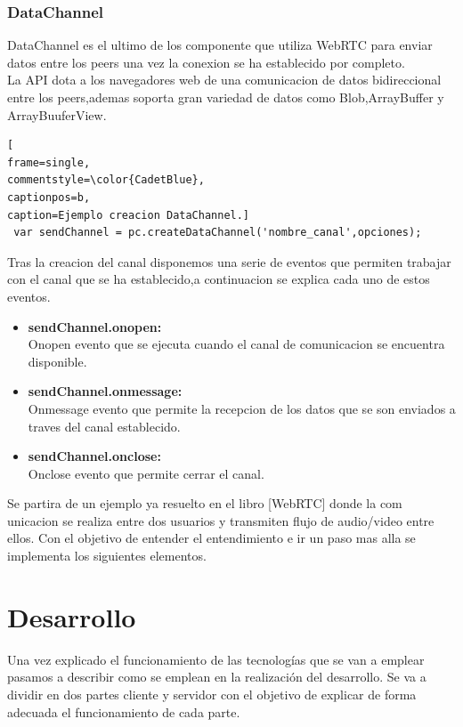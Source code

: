 \subsubsection*{DataChannel}
DataChannel es el ultimo de los componente que utiliza WebRTC para enviar datos entre los peers una vez la conexion se ha establecido por completo.
\\La API dota a los navegadores web de una comunicacion de datos bidireccional entre los peers,ademas soporta gran variedad de datos como Blob,ArrayBuffer y ArrayBuuferView.
\begin{lstlisting}[
frame=single,
commentstyle=\color{CadetBlue},
captionpos=b,
caption=Ejemplo creacion DataChannel.]
 var sendChannel = pc.createDataChannel('nombre_canal',opciones);
\end{lstlisting}
Tras la creacion del canal disponemos una serie de eventos que permiten trabajar con el canal que se ha establecido,a continuacion se explica cada uno de estos eventos.
\begin{itemize}
\item \textbf{sendChannel.onopen:}
\\Onopen evento que se ejecuta cuando el canal de comunicacion se encuentra disponible.
\item \textbf{sendChannel.onmessage:}
\\Onmessage evento que permite la recepcion de los datos que se son enviados a traves del canal establecido.
\item \textbf{sendChannel.onclose:}
\\Onclose evento que permite cerrar el canal.
\end{itemize}
Se partira de un ejemplo ya resuelto en el libro [WebRTC] donde la com
unicacion se realiza entre dos usuarios y transmiten flujo de audio/video entre ellos. Con el objetivo de entender el entendimiento e ir un paso mas alla se implementa los siguientes elementos.


\section{Desarrollo}
Una vez explicado el funcionamiento de las tecnologías  que se van a emplear pasamos a describir como se emplean en la realización del desarrollo.
Se va a dividir en dos partes cliente y servidor con el objetivo de explicar de forma adecuada el funcionamiento de cada parte.

